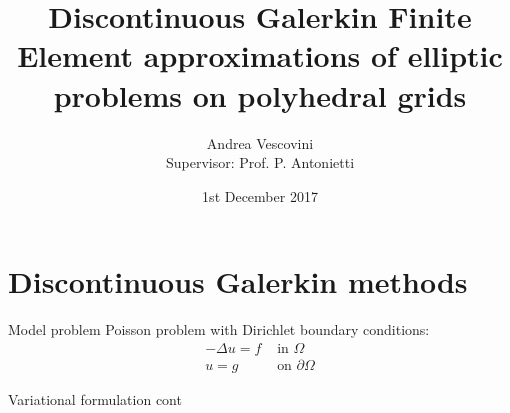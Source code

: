 \documentclass{beamer}
\title
[DG-FE approximations of elliptic problems of polyhedral grids]
{Discontinuous Galerkin Finite Element approximations of elliptic problems on 
polyhedral grids}
\author[Andrea Vescovini]{Andrea Vescovini\\ Supervisor: Prof. P. Antonietti}
\institute{Politecnico di Milano}
\date{1st December 2017}
\begin{document}
\begin{frame}
	\centering
	\maketitle
\end{frame}
\begin{frame}
	\tableofcontents
\end{frame}
\section[DG methods]{Discontinuous Galerkin methods}
\begin{frame}{Model problem}
	Poisson problem with Dirichlet boundary conditions:
	\begin{align} \label{eq:poisson}
	-\Delta u = f & \mbox{ in } \Omega\\
	u = g & \mbox{ on } \partial \Omega
	\end{align}	
\end{frame}
\begin{frame}{Variational formulation}
	cont
\end{frame}
\end{document}
